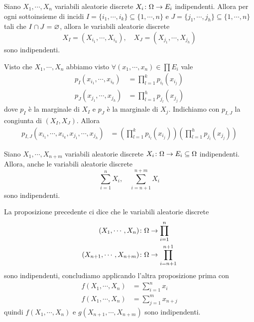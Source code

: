 \documentclass[a4paper]{article}
\begin{document}
\begin{snippetproposition}{}
    Siano \(X_1, \cdots, X_n\) variabili aleatorie discrete
    \(X_i \colon \Omega \to E_i\)
    indipendenti. Allora per ogni sottoinsieme di incidi
    \(I = \{i_1, \cdots, i_k\} \subseteq \{1, \cdots, n\}\)
    e \(J = \{j_1, \cdots, j_h\} \subseteq \{1, \cdots, n\}\)
    tali che \(I \cap J = \varnothing\), allora le variabili aleatorie discrete
    \[
        X_I = (X_{i_1}, \cdots, X_{i_k}),
        \quad
        X_J = (X_{j_1}, \cdots, X_{j_h})
    \]
    sono indipendenti.
\end{snippetproposition}

\begin{snippetproof}{}
    Visto che \(X_1, \cdots, X_n\)
    abbiamo visto \(\forall (x_1, \cdots, x_n) \in \prod E_i\) vale
    \begin{align*}
        p_I(x_{i_1}, \cdots, x_{i_k}) &= \prod_{l = 1}^k p_{i_l}(x_{i_j}) \\
        p_J(x_{j_1}, \cdots, x_{j_h}) &= \prod_{l = 1}^h p_{j_l}(x_{j_j})
    \end{align*}
    dove \(p_I\) è la marginale di \(X_I\) e \(p_J\) è la marginale di \(X_j\).
    Indichiamo con \(p_{I,J}\) la congiunta di \((X_I, X_J)\). Allora
    \begin{align*}
        p_{I, J}(x_{i_1}, \cdots, x_{i_k}, x_{j_1}, \cdots, x_{j_h})
        &= \left(\prod_{l = 1}^k p_{i_l}(x_{i_j})\right)
        \left(\prod_{l = 1}^h p_{j_l}(x_{j_j})\right)
    \end{align*}
\end{snippetproof}

\begin{snippetproposition}{}
    Siano \(X_1, \cdots, X_{n+m}\) variabili aleatorie discrete
    \(X_i \colon \Omega \to E_i \subseteq \Omega\) indipendenti.
    Allora, anche le variabili aleatorie discrete
    \[
        \sum_{i=1}^n X_i, \quad \sum_{i=n+1}^{n+m} X_i
    \]
    sono indipendenti.
\end{snippetproposition}

\begin{snippetproof}{}
    La proposizione precedente %
    ci dice che le variabili aleatorie discrete
    \begin{align*}
        (X_1, \cdots, X_n) &\colon \Omega \to \prod_{i=1}^n \\
        (X_{n+1}, \cdots, X_{n+m}) &\colon \Omega \to \prod_{i=n+1}^{n+1}
    \end{align*}
    sono indipendenti, concludiamo applicando
    l'altra proposizione prima %
    con
    \begin{align*}
        f(X_1, \cdots, X_n) &= \sum_{i=1}^n x_i \\
        f(X_1, \cdots, X_n) &= \sum_{j=1}^m x_{n+j}
    \end{align*}
    quindi \(f(X_1, \cdots, X_n)\) e \(g(X_{n+1}, \cdots, X_{n+m})\)
    sono indipendenti.
\end{snippetproof}
\end{document}
